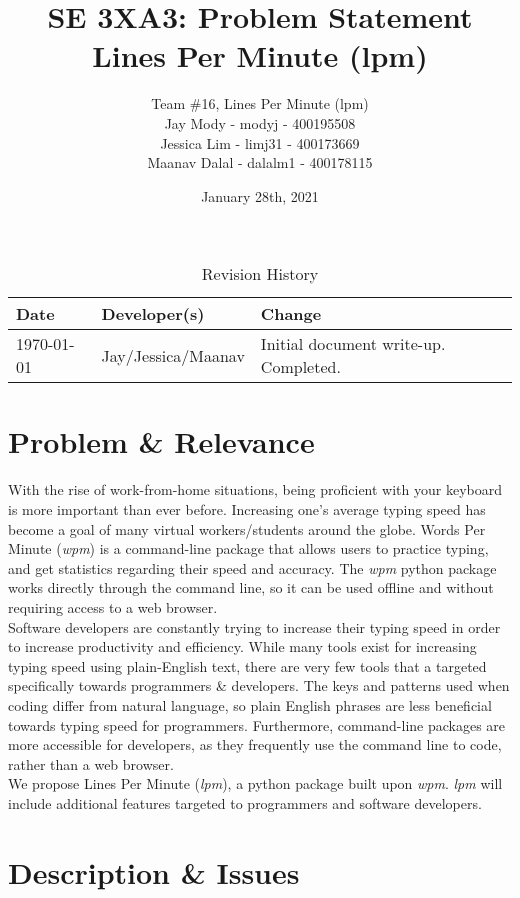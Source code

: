 \documentclass{article}
\title{SE 3XA3: Problem Statement\\Lines Per Minute (lpm)}
\author{Team \#16, Lines Per Minute (lpm) \\
Jay Mody - modyj - 400195508\\
Jessica Lim - limj31 - 400173669\\
Maanav Dalal - dalalm1 - 400178115\\
}
\date{January 28th, 2021}
\begin{document}
\maketitle

\begin{table}[hp]
\caption{Revision History} \label{TblRevisionHistory}
\begin{tabularx}{\textwidth}{llX}
\toprule
\textbf{Date} & \textbf{Developer(s)} & \textbf{Change}\\
\midrule
\today & Jay/Jessica/Maanav & Initial document write-up. Completed.\\
\bottomrule
\end{tabularx}
\end{table}


\newpage

\section*{Problem \& Relevance}
With the rise of work-from-home situations, being proficient with your keyboard is more important than ever before. Increasing one's average typing speed has become a goal of many virtual workers/students around the globe. Words Per Minute (\textit{wpm}) is a command-line package that allows users to practice typing, and get statistics regarding their speed and accuracy. The \textit{wpm} python package works directly through the command line, so it can be used offline and without requiring access to a web browser. \\

Software developers are constantly trying to increase their typing speed in order to increase productivity and efficiency. While many tools exist for increasing typing speed using plain-English text, there are very few tools that a targeted specifically towards programmers \& developers. The keys and patterns used when coding differ from natural language, so plain English phrases are less beneficial towards typing speed for programmers. Furthermore, command-line packages are more accessible for developers, as they frequently use the command line to code, rather than a web browser. \\

We propose Lines Per Minute (\textit{lpm}), a python package built upon \textit{wpm}. \textit{lpm} will include additional features targeted to programmers and software developers. \\

\section*{Description \& Issues}
\end{document}
